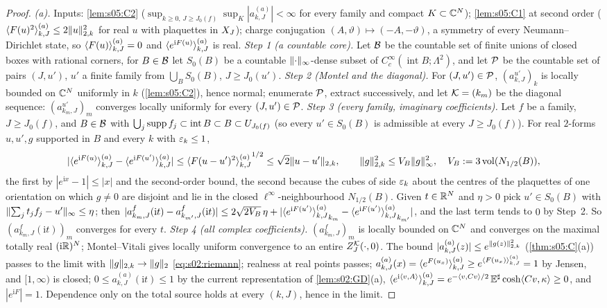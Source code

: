 \begin{proof}
\emph{(a).} Inputs: \cref{lem:s05:C2} ($\sup_{k\ge0,\,J\ge J_0(f)}\sup_K|a^{(a)}_{k,J}|<\infty$ for every family and compact $K\subset\mathbb C^N$); \cref{lem:s05:C1} at second order ($\langle F(u)^2\rangle^{(a)}_{k,J}\le2\lVert u\rVert^2_{2,k}$ for real $u$ with plaquettes in $X_J$); charge conjugation $(A,\vartheta)\mapsto(-A,-\vartheta)$, a symmetry of every Neumann--Dirichlet state, so $\langle F(u)\rangle^{(a)}_{k,J}=0$ and $\langle e^{\mathrm iF(u)}\rangle^{(a)}_{k,J}$ is real.
\emph{Step 1 (a countable core).} Let $\mathcal B$ be the countable set of finite unions of closed boxes with rational corners, for $B\in\mathcal B$ let $S_0(B)$ be a countable $\lVert \cdot\rVert_\infty$-dense subset of $C^\infty_c(\operatorname{int}B;\Lambda^2)$, and let $\mathcal{P}$ be the countable set of pairs $(J,u')$, $u'$ a finite family from $\bigcup_BS_0(B)$, $J\ge J_0(u')$.
\emph{Step 2 (Montel and the diagonal).} For $(J,u')\in\mathcal{P}$, $(a^{u'}_{k,J})_k$ is locally bounded on $\mathbb C^N$ uniformly in $k$ (\cref{lem:s05:C2}), hence normal; enumerate $\mathcal{P}$, extract successively, and let $\mathcal K=(k_m)$ be the diagonal sequence: $(a^{u'}_{k_m,J})_m$ converges locally uniformly for every $(J,u')\in\mathcal{P}$.
\emph{Step 3 (every family, imaginary coefficients).} Let $f$ be a family, $J\ge J_0(f)$, and $B\in\mathcal B$ with $\bigcup_j\operatorname{supp} f_j\subset\operatorname{int}B\subset B\subset U_{J_0(f)}$ (so every $u'\in S_0(B)$ is admissible at every $J\ge J_0(f)$). For real $2$-forms $u,u',g$ supported in $B$ and every $k$ with $\varepsilon_k\le1$,
\[
|\langle e^{\mathrm iF(u)}\rangle^{(a)}_{k,J}-\langle e^{\mathrm iF(u')}\rangle^{(a)}_{k,J}|\le{\ensuremath{\langle F(u-u')^2\rangle^{(a)}_{k,J}}}^{1/2}\le\sqrt2\lVert u-u'\rVert_{2,k},\qquad \lVert g\rVert^2_{2,k}\le V_B\lVert g\rVert_\infty^2,\quad V_B:=3\operatorname{vol}(N_{1/2}(B)),
\]
the first by $|e^{\mathrm ix}-1|\le|x|$ and the second-order bound, the second because the cubes of side $\varepsilon_k$ about the centres of the plaquettes of one orientation on which $g\ne0$ are disjoint and lie in the closed $\ell^\infty$-neighbourhood $N_{1/2}(B)$. Given $t\in\mathbb R^N$ and $\eta>0$ pick $u'\in S_0(B)$ with $\lVert \sum_jt_jf_j-u'\rVert_\infty\le\eta$; then $|a^f_{k_m,J}(\mathrm it)-a^f_{k_{m'},J}(\mathrm it)|\le2\sqrt{2V_B}\,\eta+|{\langle e^{\mathrm iF(u')}\rangle^{(a)}_{k,J}}_{k_m}-{\langle e^{\mathrm iF(u')}\rangle^{(a)}_{k,J}}_{k_{m'}}|$, and the last term tends to $0$ by Step~2. So $(a^f_{k_m,J}(\mathrm it))_m$ converges for every $t$.
\emph{Step 4 (all complex coefficients).} $(a^f_{k_m,J})_m$ is locally bounded on $\mathbb C^N$ and converges on the maximal totally real $(\mathrm i\mathbb R)^N$; Montel--Vitali gives locally uniform convergence to an entire $Z^{\mathcal K}_J(\cdot,0)$. The bound $|a^{(a)}_{k,J}(z)|\le e^{\lVert g(z)\rVert^2_{2,k}}$ (\cref{thm:s05:C}(a)) passes to the limit with $\lVert g\rVert_{2,k}\to\lVert g\rVert_2$ \eqref{eq:s02:riemann}; realness at real points passes; $a^{(a)}_{k,J}(x)=\langle e^{F(u_x)}\rangle^{(a)}_{k,J}\ge e^{\langle F(u_x)\rangle^{(a)}_{k,J}}=1$ by Jensen, and $[1,\infty)$ is closed; $0\le a^{(a)}_{k,J}(\mathrm it)\le1$ by the current representation of \cref{lem:s02:GD}(a), $\langle e^{\mathrm i\langle v,A\rangle}\rangle^{(a)}_{k,J}=e^{-\langle v,Cv\rangle/2}\,\mathbb E^\sharp\cosh\langle Cv,\kappa\rangle\ge0$, and $|e^{\mathrm iF}|=1$. Dependence only on the total source holds at every $(k,J)$, hence in the limit.

\end{proof}
